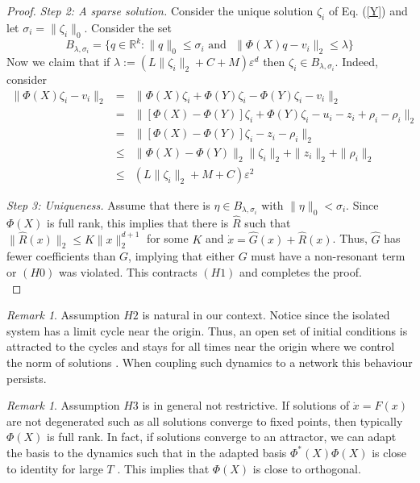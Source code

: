 \documentclass[12pt]{article}
\theoremstyle{plain}
\theoremstyle{definition}
\theoremstyle{remark}
\newtheorem{remk}[thr]{Remark}
\theoremstyle{remark}
\begin{document}
\begin{proof}
{\it Step 2: A sparse solution.} Consider the unique solution $\zeta_i$ of Eq. (\ref{Y}) and let  $\sigma_i = \|\zeta_i \|_0$. Consider the set
$$
B_{\lambda, \sigma_i} = \{ q \in \mathbb{R}^k: \| q\|_0 \le \sigma_i \mbox{~and ~} 
\| \Phi(X)q - v_i \|_2 \le \lambda \}
$$
Now we claim that if $\lambda:= (L \| \zeta_i\|_2 + C+ M) \varepsilon^{d}$ then $\zeta_i \in B_{\lambda, \sigma_i}$. Indeed, consider 
\begin{eqnarray}
\| \Phi(X) \zeta_i - v_i \|_2 &=& \| \Phi(X) \zeta_i + \Phi(Y) \zeta_i - \Phi(Y) \zeta_i- v_i \|_2 \nonumber \\
&=& \| [ \Phi(X) - \Phi(Y) ] \zeta_i + \Phi(Y) \zeta_i- u_i - z_i +\rho_i - \rho_i \|_2 \nonumber \\
&=& \| [ \Phi(X) - \Phi(Y) ] \zeta_i- z_i - \rho_i \|_2 \nonumber \\
&\le & \| \Phi(X) - \Phi(Y) \|_2 \| \zeta_i \|_2 +  \|z_i\|_2 +  \|\rho_i \|_2 \nonumber \\
&\le& (L  \| \zeta_i \|_2 + M + C) \varepsilon^2 \nonumber
\end{eqnarray}
 


{\it Step 3: Uniqueness.}
Assume that there is $\eta \in B_{\lambda, \sigma_i}$ with $\| \eta\|_0 < \sigma_i$. Since $\Phi(X)$ is full rank, this implies that there is 
$\hat R$ such that $\| \hat R(x) \|_2 \le K \| x\|_2^{d+1}$ for some $K$ and $\dot x = \hat G(x) + \hat R(x)$. Thus, $\hat G$ has fewer coefficients than $G$, implying that either $G$ must have a non-resonant term or $(H0)$ was violated.  This contracts $(H1)$ and completes the proof. \\
\end{proof}




\begin{remk} Assumption $H2$ is natural in our context. Notice since the isolated system has a  limit cycle near the origin. Thus,  an open set of initial conditions is attracted to the cycles and stays for all times near the origin where we control the norm of solutions \cite{Stankovski_RMP_2017}. When coupling such dynamics to a network this behaviour persists. \\
\end{remk}


\begin{remk}
Assumption $H3$ is in general not restrictive. If solutions of $\dot x=F(x)$ are not degenerated such as all solutions converge to fixed points, then typically $\Phi(X)$ is full rank. In fact, if solutions converge to an attractor, we can adapt the basis to the dynamics such that in the adapted basis $\Phi^*(X) \Phi(X)$  is close to identity for large $T$ \cite{PhysicaD}. This implies that $\Phi(X)$ is close to orthogonal.  \\
\end{remk} 
\end{document}
